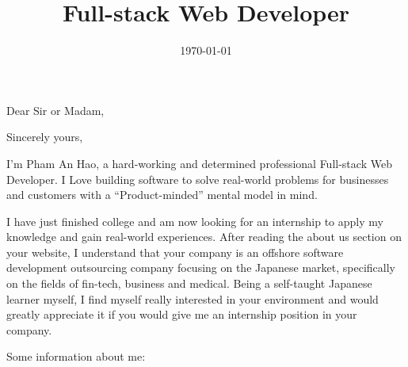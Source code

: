 \documentclass[11pt,a4paper,sans]{moderncv}        %
\title{Full-stack Web Developer}
\begin{document}
\clearpage

\date{\today}
\opening{Dear Sir or Madam,}
\closing{Sincerely yours,}
\makelettertitle

I'm Pham An Hao, a hard-working and determined professional Full-stack Web Developer. I Love building software to solve real-world problems for businesses and customers with a ``Product-minded'' mental model in mind.


I have just finished college and am now looking for an internship to apply my knowledge and gain real-world experiences. After reading the about us section on your website, I understand that your company is an offshore software development outsourcing company focusing on the Japanese market, specifically on the fields of fin-tech, business and medical. Being a self-taught Japanese learner myself, I find myself really interested in your environment and would greatly appreciate it if you would give me an internship position in your company.

Some information about me:

\end{document}

